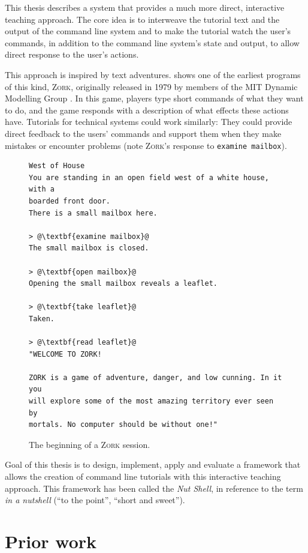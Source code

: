 \documentclass[paper=a4,twoside,abstract=on,cleardoublepage=empty,numbers=noenddot,toc=bib,12pt,appendixprefix=true]{scrreprt}
\begin{document}
This thesis describes a system that provides a much more direct, interactive teaching approach. The core idea is to interweave the tutorial text and the output of the command line system and to make the tutorial watch the user's commands, in addition to the command line system's state and output, to allow direct response to the user's actions.

This approach is inspired by text adventures.  shows one of the earliest programs of this kind, \textsc{Zork}, originally released in 1979 by members of the MIT Dynamic Modelling Group \cite{infocom}. In this game, players type short commands of what they want to do, and the game responds with a description of what effects these actions have. Tutorials for technical systems could work similarly: They could provide direct feedback to the users' commands and support them when they make mistakes or encounter problems (note \textsc{Zork}'s response to \texttt{examine mailbox}).

\begin{figure}[tb]
    \begin{lstlisting}[escapechar=@,frame=shadowbox]
West of House
You are standing in an open field west of a white house, with a
boarded front door.
There is a small mailbox here.

> @\textbf{examine mailbox}@
The small mailbox is closed.

> @\textbf{open mailbox}@
Opening the small mailbox reveals a leaflet.

> @\textbf{take leaflet}@
Taken.

> @\textbf{read leaflet}@
"WELCOME TO ZORK!

ZORK is a game of adventure, danger, and low cunning. In it you
will explore some of the most amazing territory ever seen by
mortals. No computer should be without one!"
    \end{lstlisting}
    \centering
    \caption{The beginning of a \textsc{Zork} session.}
    \label{fig:zork}
\end{figure}

Goal of this thesis is to design, implement, apply and evaluate a framework that allows the creation of command line tutorials with this interactive teaching approach. This framework has been called the \emph{Nut Shell}, in reference to the term \emph{in a nutshell} (“to the point”, “short and sweet”).

\section{Prior work}
\end{document}
